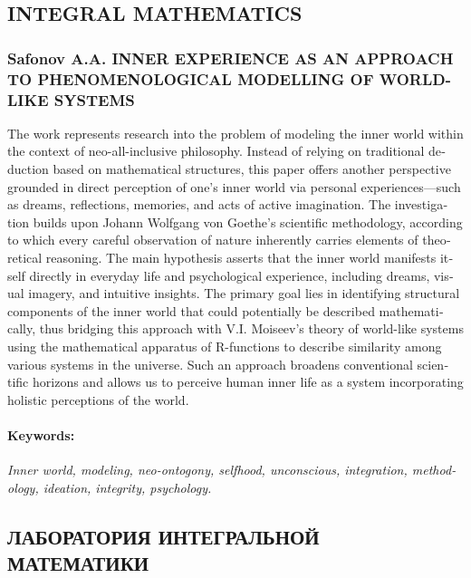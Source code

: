 \ifprintabstract
\begin{english}
	\subsection{INTEGRAL MATHEMATICS}
	\label{subsec:safonov-en}

	\subsubsection{Safonov A.A. INNER EXPERIENCE AS AN APPROACH TO PHENOMENOLOGICAL MODELLING OF WORLD-LIKE SYSTEMS}
	\label{subsubsec:safonov-title-en}

	The work represents research into the problem of modeling the inner world within the context of neo-all-inclusive philosophy. Instead of relying on traditional deduction based on mathematical structures, this paper offers another perspective grounded in direct perception of one's inner world via personal experiences—such as dreams, reflections, memories, and acts of active imagination. The investigation builds upon Johann Wolfgang von Goethe's scientific methodology, according to which every careful observation of nature inherently carries elements of theoretical reasoning. The main hypothesis asserts that the inner world manifests itself directly in everyday life and psychological experience, including dreams, visual imagery, and intuitive insights. The primary goal lies in identifying structural components of the inner world that could potentially be described mathematically, thus bridging this approach with V.I. Moiseev's theory of world-like systems using the mathematical apparatus of R-functions to describe similarity among various systems in the universe. Such an approach broadens conventional scientific horizons and allows us to perceive human inner life as a system incorporating holistic perceptions of the world.

	\paragraph{Keywords:} \textit{Inner world, modeling, neo-ontogony, selfhood, unconscious, integration, methodology, ideation, integrity, psychology.}
\end{english}
\else
\subsection{ЛАБОРАТОРИЯ ИНТЕГРАЛЬНОЙ МАТЕМАТИКИ}
\label{subsec:safonov-ru}

